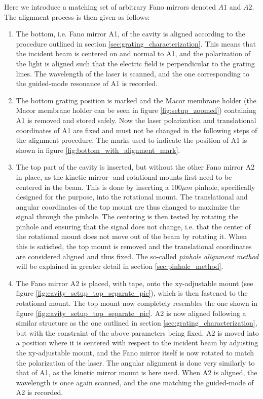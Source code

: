 Here we introduce a matching set of arbitrary Fano mirrors denoted $A1$ and $A2$. The alignment process is then given as follows: 
\begin{enumerate}
    \item The bottom, i.e. Fano mirror A1, of the cavity is aligned according to the procedure outlined in section \ref{sec:grating_characterization}. This means that the incident beam is centered on and normal to A1, and the polarization of the light is aligned such that the electric field is perpendicular to the grating lines. The wavelength of the laser is scanned, and the one corresponding to the guided-mode resonance of A1 is recorded.  
    \item The bottom grating position is marked and the Macor membrane holder (the Macor membrane holder can be seen in figure \ref{fig:setup_zoomed}) containing A1 is removed and stored safely. Now the laser polarization and translational coordinates of A1 are fixed and must not be changed in the following steps of the alignment procedure. The marks used to indicate the position of A1 is shown in figure \ref{fig:bottom_with_alignment_mark}.
    \item The top part of the cavity is inserted, but without the other Fano mirror A2 in place, as the kinetic mirror- and rotational mounts first need to be centered in the beam. This is done by inserting a $100 \mu m$ pinhole, specifically designed for the purpose, into the rotational mount. The translational and angular coordinates of the top mount are thus changed to maximize the signal through the pinhole. The centering is then tested by rotating the pinhole and ensuring that the signal does not change, i.e. that the center of the rotational mount does not move out of the beam by rotating it. When this is satisfied, the top mount is removed and the translational coordinates are considered aligned and thus fixed. The so-called \emph{pinhole alignment method} will be explained in greater detail in section \ref{sec:pinhole_method}.
    \item The Fano mirror A2 is placed, with tape, onto the xy-adjustable mount (see figure \ref{fig:cavity_setup_top_separate_pic}), which is then fastened to the rotational mount. The top mount now completely resembles the one shown in figure \ref{fig:cavity_setup_top_separate_pic}. A2 is now aligned following a similar structure as the one outlined in section \ref{sec:grating_characterization}, but with the constraint of the above parameters being fixed. A2 is moved into a position where it is centered with respect to the incident beam by adjusting the xy-adjustable mount, and the Fano mirror itself is now rotated to match the polarization of the laser. The angular alignment is done very similarly to that of A1, as the kinetic mirror mount is here used. When A2 is aligned, the wavelength is once again scanned, and the one matching the guided-mode of A2 is recorded.

\end{enumerate}
